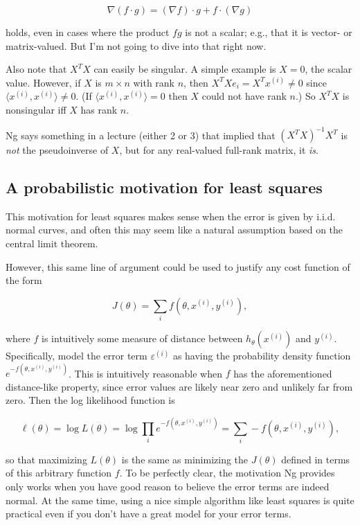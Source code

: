 \documentclass[]{article}
\begin{document}
\[\nabla(f\cdot g) = (\nabla f)\cdot g + f \cdot (\nabla g)\]

holds, even in cases where the product \(fg\) is not a scalar; e.g.,
that it is vector- or matrix-valued. But I'm not going to dive into that
right now.

Also note that \(X^TX\) can easily be singular. A simple example is
\(X=0\), the scalar value. However, if \(X\) is \(m\times n\) with rank
\(n\), then \(X^TXe_i = X^Tx^{(i)} \ne 0\) since
\(\langle x^{(i)}, x^{(i)}\rangle \ne 0.\) (If
\(\langle x^{(i)}, x^{(i)}\rangle = 0\) then \(X\) could not have rank
\(n.\)) So \(X^TX\) is nonsingular iff \(X\) has rank \(n\).

Ng says something in a lecture (either 2 or 3) that implied that
\((X^TX)^{-1}X^T\) is \emph{not} the pseudoinverse of \(X\), but for any
real-valued full-rank matrix, it \emph{is}.

\subsection{A probabilistic motivation for least
squares}\label{a-probabilistic-motivation-for-least-squares}

This motivation for least squares makes sense when the error is given by
i.i.d. normal curves, and often this may seem like a natural assumption
based on the central limit theorem.

However, this same line of argument could be used to justify any cost
function of the form

\[J(\theta) = \sum_i f(\theta, x^{(i)}, y^{(i)}),\]

where \(f\) is intuitively some measure of distance between
\(h_\theta(x^{(i)})\) and \(y^{(i)}\). Specifically, model the error
term \(\varepsilon^{(i)}\) as having the probability density function
\(e^{-f(\theta, x^{(i)}, y^{(i)})}\). This is intuitively reasonable
when \(f\) has the aforementioned distance-like property, since error
values are likely near zero and unlikely far from zero. Then the log
likelihood function is

\[\ell(\theta) = \log L(\theta)
               = \log \prod_i e^{-f(\theta, x^{(i)}, y^{(i)})}
               = \sum_i -f(\theta, x^{(i)}, y^{(i)}),\]

so that maximizing \(L(\theta)\) is the same as minimizing the
\(J(\theta)\) defined in terms of this arbitrary function \(f.\) To be
perfectly clear, the motivation Ng provides only works when you have
good reason to believe the error terms are indeed normal. At the same
time, using a nice simple algorithm like least squares is quite
practical even if you don't have a great model for your error terms.
\end{document}
